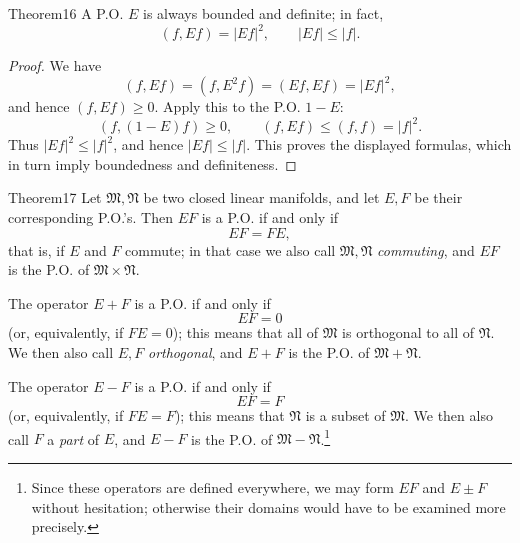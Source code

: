 ﻿\documentclass[paper=b5,fontsize=13pt,bookmarkpackage=false,twoside]{scrartcl}
\begin{document}
\begin{namedstatement}{Theorem}{16}\label{thm:16}
A P.O. $E$ is always bounded and definite; in fact,
\[
(f,Ef)=|Ef|^2,\qquad |Ef|\le|f|.
\]
\end{namedstatement}

\begin{proof}
We have
\[
(f,Ef)=(f,E^2f)=(Ef,Ef)=|Ef|^2,
\]
and hence $(f,Ef)\ge0$. Apply this to the P.O. $1-E$:
\[
(f,(1-E)f)\ge0,\qquad (f,Ef)\le(f,f)=|f|^2.
\]
Thus $|Ef|^2\le|f|^2$, and hence $|Ef|\le|f|$. This proves the displayed formulas, which in turn imply boundedness and definiteness.
\end{proof}

\begin{namedstatement}{Theorem}{17}\label{thm:17}
Let $\mathfrak M,\mathfrak N$ be two closed linear manifolds, and let $E,F$ be their corresponding P.O.'s. Then $EF$ is a P.O. if and only if
\[
EF=FE,
\]
that is, if $E$ and $F$ commute; in that case we also call $\mathfrak M,\mathfrak N$ \emph{commuting}, and $EF$ is the P.O. of $\mathfrak M\times\mathfrak N$.

The operator $E+F$ is a P.O. if and only if
\[
EF=0
\]
(or, equivalently, if $FE=0$); this means that all of $\mathfrak M$ is orthogonal to all of $\mathfrak N$. We then also call $E,F$ \emph{orthogonal}, and $E+F$ is the P.O. of $\mathfrak M+\mathfrak N$.

The operator $E-F$ is a P.O. if and only if
\[
EF=F
\]
(or, equivalently, if $FE=F$); this means that $\mathfrak N$ is a subset of $\mathfrak M$. We then also call $F$ a \emph{part} of $E$, and $E-F$ is the P.O. of $\mathfrak M-\mathfrak N$.\footnote{\label{fn:37}Since these operators are defined everywhere, we may form $EF$ and $E\pm F$ without hesitation; otherwise their domains would have to be examined more precisely.}
\end{namedstatement}
\end{document}
